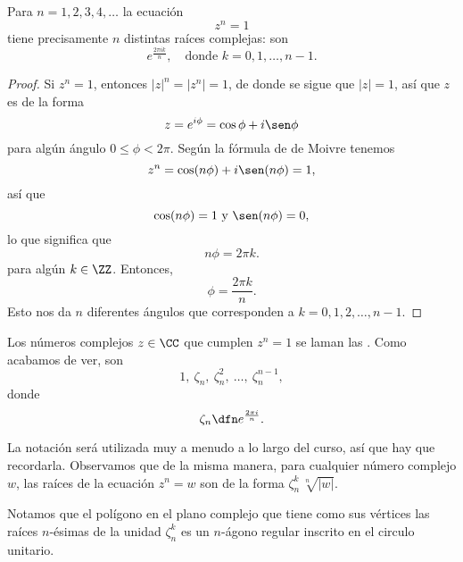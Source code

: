 \begin{proposicion}
  Para $n = 1,2,3,4,\ldots$ la ecuación
  $$z^n = 1$$
  tiene precisamente $n$ distintas raíces complejas: son
  $$e^{\frac{2\pi i k}{n}}, \quad \text{donde }k = 0,1,\ldots,n-1.$$

  \begin{proof}
    Si $z^n = 1$, entonces $|z|^n = |z^n| = 1$, de donde se sigue que $|z| = 1$,
    así que $z$ es de la forma
    $$z = e^{i\phi} = \cos \phi + i\sen\phi$$
    para algún ángulo $0 \le \phi < 2\pi$. Según la fórmula de de Moivre tenemos
    $$z^n = \cos (n\phi) + i\sen (n\phi) = 1,$$
    así que
    $$\cos (n\phi) = 1 \text{ y } \sen (n\phi) = 0,$$
    lo que significa que
    $$n\phi = 2\pi k.$$
    para algún $k \in \ZZ$. Entonces,
    $$\phi = \frac{2\pi k}{n}.$$
    Esto nos da $n$ diferentes ángulos que corresponden a
    $k = 0,1,2,\ldots,n-1$.
  \end{proof}
\end{proposicion}

\begin{definicion}
  Los números complejos $z\in \CC$ que cumplen $z^n = 1$ se laman las
  . Como acabamos de ver, son
  $$1, ~ \zeta_n, ~ \zeta_n^2, ~ \ldots, ~ \zeta_n^{n-1},$$
  donde
  \begin{equation}
    \label{eqn:zeta-n}
    \zeta_n \dfn e^{\frac{2\pi i}{n}}.
  \end{equation}
\end{definicion}

La notación  será utilizada muy a menudo a lo largo
del curso, así que hay que recordarla. Observamos que de la misma manera, para
cualquier número complejo $w$, las raíces de la ecuación $z^n = w$ son de
la forma $\zeta_n^k\,\sqrt[n]{|w|}$.

\vspace{1em}

Notamos que el polígono en el plano complejo que tiene como sus vértices
las raíces $n$-ésimas de la unidad $\zeta_n^k$ es un $n$-ágono regular inscrito
en el circulo unitario.

